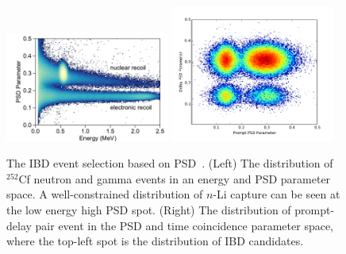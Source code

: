     	\begin{figure}[h]
    \centering
    \includegraphics[width=0.48\textwidth]{Figures/PSDvE.pdf}
    \includegraphics[width=0.48\textwidth]{Figures/PSDvT.pdf}
    \caption[Event selection based on PSD]{
    The IBD event selection based on PSD~\cite{bib:P50}.
    	(Left) The distribution of $^{252}$Cf neutron and gamma events in an energy and PSD parameter space.
    	A well-constrained distribution of $n$-Li capture can be seen at the low energy high PSD spot.
    	(Right) The distribution of prompt-delay pair event in the PSD and time coincidence parameter space, where the top-left spot is the distribution of IBD candidates.
	}
    \label{fig:PSDvEvT}
	\end{figure}
	
